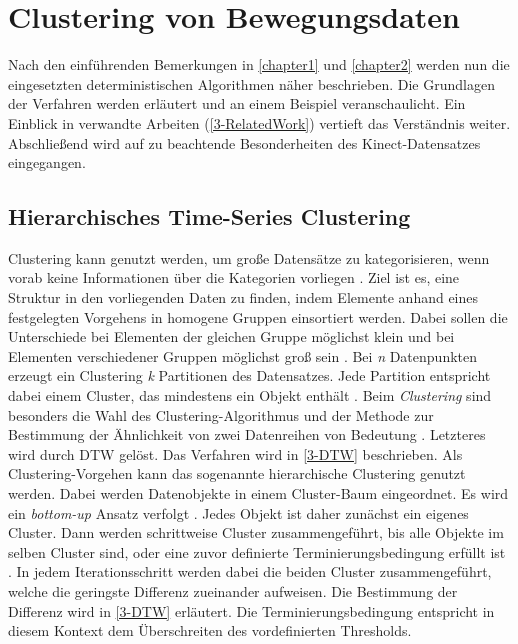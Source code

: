 \chapter{Clustering von Bewegungsdaten}
\label{chapter3}

Nach den einführenden Bemerkungen in \autoref{chapter1} und \autoref{chapter2} werden nun
die eingesetzten deterministischen Algorithmen näher beschrieben.
Die Grundlagen der Verfahren werden erläutert und an einem Beispiel veranschaulicht.
Ein Einblick in verwandte Arbeiten (\autoref{3-RelatedWork}) vertieft das Verständnis weiter.
Abschließend wird auf zu beachtende Besonderheiten des Kinect-Datensatzes eingegangen.

\section{Hierarchisches Time-Series Clustering}
\label{3-Clustering}
Clustering kann genutzt werden, um große Datensätze zu kategorisieren,
wenn vorab keine Informationen über die Kategorien vorliegen \citep{aghabozorgi_time-series_2015}.
Ziel ist es, eine Struktur in den vorliegenden Daten zu finden,
indem Elemente anhand eines festgelegten Vorgehens in homogene Gruppen einsortiert werden.
Dabei sollen die Unterschiede bei Elementen der gleichen Gruppe möglichst klein
und bei Elementen verschiedener Gruppen möglichst groß sein \citep{aghabozorgi_time-series_2015, warren_liao_clustering_2005}.
Bei \emph{n} Datenpunkten erzeugt ein Clustering \emph{k} Partitionen des Datensatzes.
Jede Partition entspricht dabei einem Cluster, das mindestens ein Objekt enthält \citep{warren_liao_clustering_2005}.
Beim \emph{Clustering} sind besonders die Wahl des Clustering-Algorithmus
und der Methode zur Bestimmung der Ähnlichkeit von zwei Datenreihen von Bedeutung \citep{warren_liao_clustering_2005}.
Letzteres wird durch \ac{DTW} gelöst.
Das Verfahren wird in \autoref{3-DTW} beschrieben.
Als Clustering-Vorgehen kann das sogenannte hierarchische Clustering genutzt werden.
Dabei werden Datenobjekte in einem Cluster-Baum eingeordnet.
Es wird ein \emph{bottom-up} Ansatz verfolgt \citep{warren_liao_clustering_2005}.
Jedes Objekt ist daher zunächst ein eigenes Cluster.
Dann werden schrittweise Cluster zusammengeführt,
bis alle Objekte im selben Cluster sind,
oder eine zuvor definierte Terminierungsbedingung erfüllt ist \citep{warren_liao_clustering_2005}.
In jedem Iterationsschritt werden dabei die beiden Cluster zusammengeführt,
welche die geringste Differenz zueinander aufweisen.
Die Bestimmung der Differenz wird in \autoref{3-DTW} erläutert.
Die Terminierungsbedingung entspricht in diesem Kontext dem Überschreiten des vordefinierten Thresholds.

